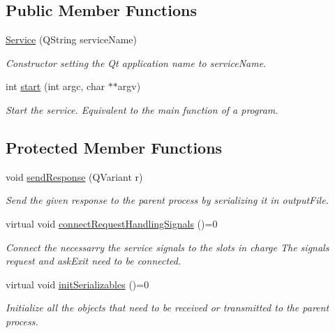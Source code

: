 \subsection*{Public Member Functions}
\begin{DoxyCompactItemize}
\item 
\hyperlink{class_gost_crypt_1_1_core_1_1_service_ab1c98ecee7d34e60a3bd2518a26f5728}{Service} (Q\+String service\+Name)
\begin{DoxyCompactList}\small\item\em Constructor setting the Qt application name to service\+Name. \end{DoxyCompactList}\item 
int \hyperlink{class_gost_crypt_1_1_core_1_1_service_a1941d4736f384edf23dbce3a9ddabf9f}{start} (int argc, char $\ast$$\ast$argv)
\begin{DoxyCompactList}\small\item\em Start the service. Equivalent to the main function of a program. \end{DoxyCompactList}\end{DoxyCompactItemize}
\subsection*{Protected Member Functions}
\begin{DoxyCompactItemize}
\item 
void \hyperlink{class_gost_crypt_1_1_core_1_1_service_aa6449013ac6ea349a3ebc694d227b80c}{send\+Response} (Q\+Variant r)
\begin{DoxyCompactList}\small\item\em Send the given response to the parent process by serializing it in output\+File. \end{DoxyCompactList}\item 
virtual void \hyperlink{class_gost_crypt_1_1_core_1_1_service_a9982bf1e986cd98b42920272cd73fb8c}{connect\+Request\+Handling\+Signals} ()=0
\begin{DoxyCompactList}\small\item\em Connect the necessarry the service signals to the slots in charge The signals request and ask\+Exit need to be connected. \end{DoxyCompactList}\item 
virtual void \hyperlink{class_gost_crypt_1_1_core_1_1_service_ae5e4ec7384c4af09f1e80aa0af7abde9}{init\+Serializables} ()=0
\begin{DoxyCompactList}\small\item\em Initialize all the objects that need to be received or transmitted to the parent process. \end{DoxyCompactList}\end{DoxyCompactItemize}


